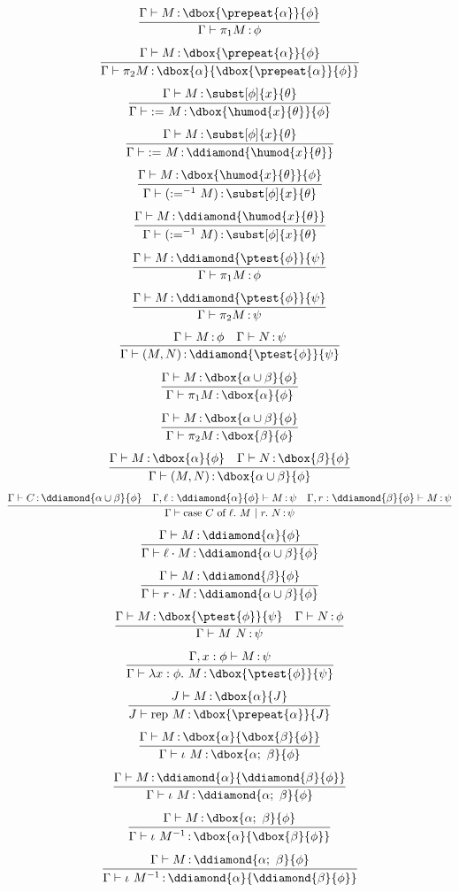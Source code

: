 \documentclass[12pt]{cmuthesis}
\theoremstyle{definition}
\theoremstyle{remark}
\begin{document}
\[\infer{\proves{\G}{\eprojL{M}}{\phi}}
        {\proves{\G}{M}{\dbox{\prepeat{\alpha}}{\phi}}}\]
\[\infer{\proves{\G}{\eprojR{M}}{\dbox{\alpha}{\dbox{\prepeat{\alpha}}{\phi}}}}
        {\proves{\G}{M}{\dbox{\prepeat{\alpha}}{\phi}}}\]
\[\infer{\proves{\G}{\easgn{M}}{\dbox{\humod{x}{\theta}}{\phi}}}
        {\proves{\G}{M}{\subst[\phi]{x}{\theta}}}\]
\[\infer{\proves{\G}{\easgn{M}}{\ddiamond{\humod{x}{\theta}}}}
        {\proves{\G}{M}{\subst[\phi]{x}{\theta}}}\]
\[\infer{\proves{\G}{\easgninv{M}}{\subst[\phi]{x}{\theta}}}
        {\proves{\G}{M}{\dbox{\humod{x}{\theta}}{\phi}}}\]
\[\infer{\proves{\G}{\easgninv{M}}{\subst[\phi]{x}{\theta}}}
        {\proves{\G}{M}{\ddiamond{\humod{x}{\theta}}}}\]
\[\infer{\proves{\G}{\eprojL{M}}{\phi}}
        {\proves{\G}{M}{\ddiamond{\ptest{\phi}}{\psi}}}\]
\[\infer{\proves{\G}{\eprojR{M}}{\psi}}
        {\proves{\G}{M}{\ddiamond{\ptest{\phi}}{\psi}}}\]
\[\infer{\proves{\G}{\econs{M}{N}}{\ddiamond{\ptest{\phi}}{\psi}}}
        {\proves{\G}{M}{\phi} & \proves{\G}{N}{\psi}}\]
\[\infer{\proves{\G}{\eprojL{M}}{\dbox{\alpha}{\phi}}}
        {\proves{\G}{M}{\dbox{\alpha\cup\beta}{\phi}}}\]
\[\infer{\proves{\G}{\eprojR{M}}{\dbox{\beta}{\phi}}}
        {\proves{\G}{M}{\dbox{\alpha\cup\beta}{\phi}}}\]
\[\infer{\proves{\G}{\econs{M}{N}}{\dbox{\alpha\cup\beta}{\phi}}}
        {\proves{\G}{M}{\dbox{\alpha}{\phi}} & \proves{\G}{N}{\dbox{\beta}{\phi}}}\]
\[\infer{\proves{\G}{\ecase{C}{M}{N}}{\psi}}
        {\proves{\G}{C}{\ddiamond{\alpha\cup\beta}{\phi}}
        &\proves{\G,\ell:\ddiamond{\alpha}{\phi}}{M}{\psi}
        &\proves{\G,r:\ddiamond{\beta}{\phi}}{M}{\psi}}\]
\[\infer{\proves{\G}{\einjL{M}}{\ddiamond{\alpha\cup\beta}{\phi}}}
        {\proves{\G}{M}{\ddiamond{\alpha}{\phi}}}\]
\[\infer{\proves{\G}{\einjR{M}}{\ddiamond{\alpha\cup\beta}{\phi}}}
        {\proves{\G}{M}{\ddiamond{\beta}{\phi}}}\]
\[\infer{\proves{\G}{\eapp{M}{N}}{\psi}}
        {\proves{\G}{M}{\dbox{\ptest{\phi}}{\psi}} 
        &\proves{\G}{N}{\phi}}\]
\[\infer{\proves{\G}{\elam{\phi}{M}}{\dbox{\ptest{\phi}}{\psi}}}
        {\proves{\G,x:\phi}{M}{\psi}}\]
\[\infer{\proves{J}{\erep{M}}{\dbox{\prepeat{\alpha}}{J}}}
        {\proves{J}{M}{\dbox{\alpha}{J}}}\]
\[\infer{\proves{\G}{\eseq{M}}{\dbox{\alpha;~\beta}{\phi}}}
        {\proves{\G}{M}{\dbox{\alpha}{\dbox{\beta}{\phi}}}}\]
\[\infer{\proves{\G}{\eseq{M}}{\ddiamond{\alpha;~\beta}{\phi}}}
        {\proves{\G}{M}{\ddiamond{\alpha}{\ddiamond{\beta}{\phi}}}}\]
\[\infer{\proves{\G}{\eseqinv{M}}{\dbox{\alpha}{\dbox{\beta}{\phi}}}}
        {\proves{\G}{M}{\dbox{\alpha;~\beta}{\phi}}}\]
\[\infer{\proves{\G}{\eseqinv{M}}{\ddiamond{\alpha}{\ddiamond{\beta}{\phi}}}}
        {\proves{\G}{M}{\ddiamond{\alpha;~\beta}{\phi}}}\]
\end{document}
